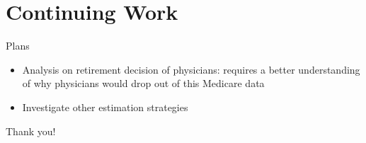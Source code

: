 \documentclass[10pt]{beamer}
\begin{document}
\section{Continuing Work}

\begin{frame}{Plans}
    \begin{itemize}
        \item Analysis on retirement decision of physicians: requires a better understanding of why physicians would drop out of this Medicare data
        \item Investigate other estimation strategies
    \end{itemize}
\end{frame}

\begin{frame}{}
\centering
    Thank you!
\end{frame}
\end{document}
